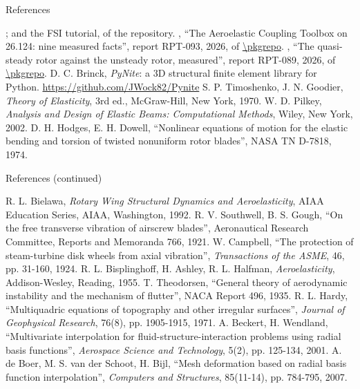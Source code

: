 \documentclass[aspectratio=169,11pt]{beamer}
\begin{document}
\begin{frame}{References}
\begin{reflist}
   ; and the FSI tutorial,
         of the repository.
   \pkgauthor, ``The Aeroelastic Coupling Toolbox on 26.124: nine
        measured facts'', report RPT-093, 2026,  of
        \url{\pkgrepo}.
   \pkgauthor, ``The quasi-steady rotor against the unsteady rotor,
        measured'', report RPT-089, 2026,  of \url{\pkgrepo}.
   \recordsref
   D. C. Brinck, \emph{PyNite}: a 3D structural finite element library
        for Python. \url{https://github.com/JWock82/Pynite}
   S. P. Timoshenko, J. N. Goodier, \emph{Theory of Elasticity}, 3rd ed.,
        McGraw-Hill, New York, 1970.
   W. D. Pilkey, \emph{Analysis and Design of Elastic Beams:
        Computational Methods}, Wiley, New York, 2002.
   D. H. Hodges, E. H. Dowell, ``Nonlinear equations of motion for the
        elastic bending and torsion of twisted nonuniform rotor blades'',
        NASA TN D-7818, 1974.
\end{reflist}
\end{frame}

\begin{frame}{References (continued)}
\begin{reflist}
  \setcounter{enumi}{8}
   R. L. Bielawa, \emph{Rotary Wing Structural Dynamics and
        Aeroelasticity}, AIAA Education Series, AIAA, Washington, 1992.
   R. V. Southwell, B. S. Gough, ``On the free transverse vibration of
        airscrew blades'', Aeronautical Research Committee, Reports and
        Memoranda 766, 1921.
   W. Campbell, ``The protection of steam-turbine disk wheels from axial
        vibration'', \emph{Transactions of the ASME}, 46, pp. 31-160, 1924.
   R. L. Bisplinghoff, H. Ashley, R. L. Halfman, \emph{Aeroelasticity},
        Addison-Wesley, Reading, 1955.
   T. Theodorsen, ``General theory of aerodynamic instability and the
        mechanism of flutter'', NACA Report 496, 1935.
   R. L. Hardy, ``Multiquadric equations of topography and other
        irregular surfaces'', \emph{Journal of Geophysical Research}, 76(8),
        pp. 1905-1915, 1971.
   A. Beckert, H. Wendland, ``Multivariate interpolation for
        fluid-structure-interaction problems using radial basis functions'',
        \emph{Aerospace Science and Technology}, 5(2), pp. 125-134, 2001.
   A. de Boer, M. S. van der Schoot, H. Bijl, ``Mesh deformation based
        on radial basis function interpolation'', \emph{Computers and
        Structures}, 85(11-14), pp. 784-795, 2007.
\end{reflist}
\end{frame}
\end{document}
